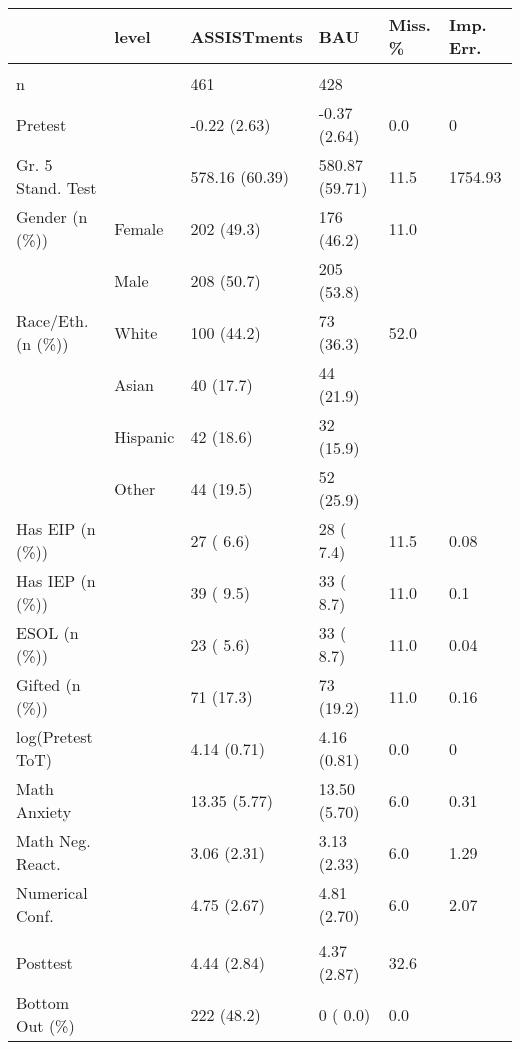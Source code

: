 \small
\begin{tabular}[t]{llllll}
\toprule
  & level & ASSISTments & BAU & Miss. \% & Imp. Err.\\
\midrule
\addlinespace[0.3em]
\multicolumn{6}{l}{\textbf{Baseline}}\\
n &  & 461 & 428 &  & \\
Pretest &  & -0.22 (2.63) & -0.37 (2.64) & 0.0 & 0\\
Gr. 5 Stand. Test &  & 578.16 (60.39) & 580.87 (59.71) & 11.5 & 1754.93\\
Gender  (n (\%)) & Female & 202 (49.3) & 176 (46.2) & 11.0 & \\
 & Male & 208 (50.7) & 205 (53.8) &  & \\
Race/Eth. (n (\%)) & White & 100 (44.2) & 73 (36.3) & 52.0 & \\
 & Asian & 40 (17.7) & 44 (21.9) &  & \\
 & Hispanic & 42 (18.6) & 32 (15.9) &  & \\
 & Other & 44 (19.5) & 52 (25.9) &  & \\
Has EIP (n (\%)) &  & 27 ( 6.6) & 28 ( 7.4) & 11.5 & 0.08\\
Has IEP (n (\%)) &  & 39 ( 9.5) & 33 ( 8.7) & 11.0 & 0.1\\
ESOL (n (\%)) &  & 23 ( 5.6) & 33 ( 8.7) & 11.0 & 0.04\\
Gifted (n (\%)) &  & 71 (17.3) & 73 (19.2) & 11.0 & 0.16\\
log(Pretest ToT) &  & 4.14 (0.71) & 4.16 (0.81) & 0.0 & 0\\
Math Anxiety &  & 13.35 (5.77) & 13.50 (5.70) & 6.0 & 0.31\\
Math Neg. React. &  & 3.06 (2.31) & 3.13 (2.33) & 6.0 & 1.29\\
Numerical Conf. &  & 4.75 (2.67) & 4.81 (2.70) & 6.0 & 2.07\\
\addlinespace[0.3em]
\multicolumn{6}{l}{\textbf{Post-Treatment}}\\
Posttest &  & 4.44 (2.84) & 4.37 (2.87) & 32.6 & \\
Bottom Out (\%) &  & 222 (48.2) & 0 ( 0.0) & 0.0 & \\
\bottomrule
\end{tabular}
